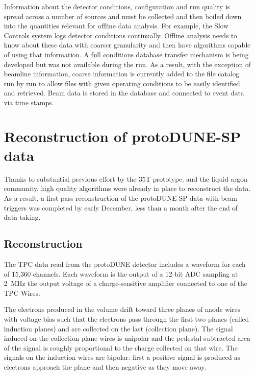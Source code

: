 Information about the detector conditions,  configuration and run quality is spread across a number of sources and must be collected and then boiled down into the quantities relevant for offline data analysis.  For example, the Slow Controls system logs detector conditions continually.  Offline analysis needs to know about these data with coarser granularity and then have algorithms capable of using that information. A full conditions database transfer mechanism is being developed but was not available during the run.  As a result, with the exception of beamline information, coarse information is currently added to the  file catalog run by run to allow files with given operating conditions to be easily identified and retrieved. Beam data is stored in the 
database and connected to event data via time stamps.

\section{Reconstruction of protoDUNE-SP data}
Thanks to substantial previous effort by the 35T prototype,  and the liquid argon community, high quality algorithms were already in place to reconstruct the data.  As a result, a first pass reconstruction of the protoDUNE-SP data with beam triggers was completed by early December, less than a month after the end of data taking.

\subsection{Reconstruction}

The TPC data read from the protoDUNE detector includes a waveform for
each of 15,360 channels. Each waveform is the output of a 12-bit ADC sampling
at 2~MHz the output voltage of a charge-sensitive amplifier connected to one of
the TPC Wires. 

The electrons produced in the  volume drift %
toward three planes of anode wires with voltage bias such that the electrons
pass through the first two planes (called induction planes) and are collected
on the last (collection plane).
The signal induced on the collection plane wires is unipolar 
and the pedestal-subtracted area of the signal is roughly proportional to the
charge collected on that wire.
The signals on the induction wires are bipolar: first a positive signal is produced as
electrons approach the plane and then negative as they move away.
